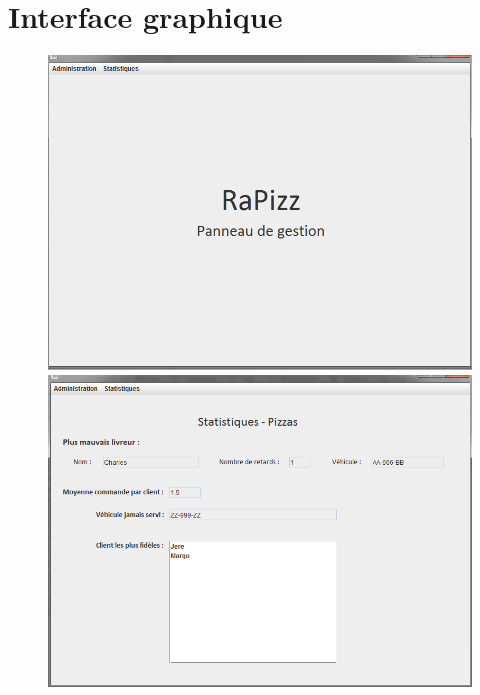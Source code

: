 \documentclass[]{article}
\begin{document}
\newpage

\section{Interface graphique}\label{interface-graphique}

\begin{figure}[!htb]
    \includegraphics{../img/ihm/accueil.png}
\endminipage\hfill
{}
\includegraphics{../img/ihm/stats.png}
\endminipage\hfill
\end{figure}
\end{document}
